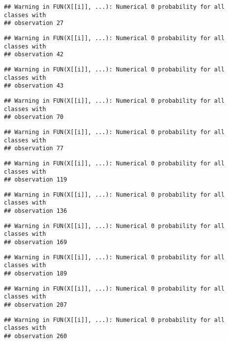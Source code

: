 \documentclass[]{article}
\begin{document}
\begin{verbatim}
## Warning in FUN(X[[i]], ...): Numerical 0 probability for all classes with
## observation 27
\end{verbatim}

\begin{verbatim}
## Warning in FUN(X[[i]], ...): Numerical 0 probability for all classes with
## observation 42
\end{verbatim}

\begin{verbatim}
## Warning in FUN(X[[i]], ...): Numerical 0 probability for all classes with
## observation 43
\end{verbatim}

\begin{verbatim}
## Warning in FUN(X[[i]], ...): Numerical 0 probability for all classes with
## observation 70
\end{verbatim}

\begin{verbatim}
## Warning in FUN(X[[i]], ...): Numerical 0 probability for all classes with
## observation 77
\end{verbatim}

\begin{verbatim}
## Warning in FUN(X[[i]], ...): Numerical 0 probability for all classes with
## observation 119
\end{verbatim}

\begin{verbatim}
## Warning in FUN(X[[i]], ...): Numerical 0 probability for all classes with
## observation 136
\end{verbatim}

\begin{verbatim}
## Warning in FUN(X[[i]], ...): Numerical 0 probability for all classes with
## observation 169
\end{verbatim}

\begin{verbatim}
## Warning in FUN(X[[i]], ...): Numerical 0 probability for all classes with
## observation 189
\end{verbatim}

\begin{verbatim}
## Warning in FUN(X[[i]], ...): Numerical 0 probability for all classes with
## observation 207
\end{verbatim}

\begin{verbatim}
## Warning in FUN(X[[i]], ...): Numerical 0 probability for all classes with
## observation 260
\end{verbatim}
\end{document}

